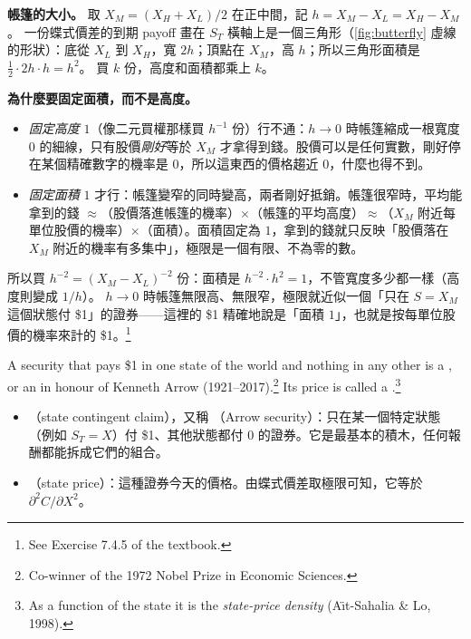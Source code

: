 \textbf{帳篷的大小。}
取 $X_{M}=(X_{H}+X_{L})/2$ 在正中間，記 $h=X_{M}-X_{L}=X_{H}-X_{M}$。
一份蝶式價差的到期 payoff 畫在 $S_{T}$ 橫軸上是一個三角形（\autoref{fig:butterfly} 虛線的形狀）：底從 $X_{L}$ 到 $X_{H}$，寬 $2h$；頂點在 $X_{M}$，高 $h$；所以三角形面積是 $\tfrac12\cdot 2h\cdot h=h^{2}$。
買 $k$ 份，高度和面積都乘上 $k$。

\textbf{為什麼要固定面積，而不是高度。}
\begin{itemize}[itemsep=0.3em]
	\item \emph{固定高度} $1$（像二元買權那樣買 $h^{-1}$ 份）行不通：$h\to 0$ 時帳篷縮成一根寬度 $0$ 的細線，只有股價\emph{剛好}等於 $X_{M}$ 才拿得到錢。股價可以是任何實數，剛好停在某個精確數字的機率是 $0$，所以這東西的價格趨近 $0$，什麼也得不到。
	\item \emph{固定面積} $1$ 才行：帳篷變窄的同時變高，兩者剛好抵銷。帳篷很窄時，平均能拿到的錢 $\approx$（股價落進帳篷的機率）$\times$（帳篷的平均高度）$\approx$（$X_{M}$ 附近每單位股價的機率）$\times$（面積）。面積固定為 $1$，拿到的錢就只反映「股價落在 $X_{M}$ 附近的機率有多集中」，極限是一個有限、不為零的數。
\end{itemize}
所以買 $h^{-2}=(X_{M}-X_{L})^{-2}$ 份：面積是 $h^{-2}\cdot h^{2}=1$，不管寬度多少都一樣（高度則變成 $1/h$）。
$h\to 0$ 時帳篷無限高、無限窄，極限就近似一個「只在 $S=X_{M}$ 這個狀態付 \$1」的證券——這裡的 \$1 精確地說是「面積 $1$」，也就是按每單位股價的機率來計的 \$1。\footnote{See Exercise 7.4.5 of the textbook.}
\suppend

\begin{definition}
	A security that pays \$1 in one state of the world and nothing in any other is a , or an  in honour of Kenneth Arrow (1921--2017).\footnote{Co-winner of the 1972 Nobel Prize in Economic Sciences.}
	Its price is called a .\footnote{As a function of the state it is the \emph{state-price density} (A\"{\i}t-Sahalia \& Lo, 1998).}
\end{definition}

\suppstart
\begin{remark}
	\begin{itemize}[nosep]
		\item {}（state contingent claim），又稱 （Arrow security）：只在某一個特定狀態（例如 $S_{T}=X$）付 \$1、其他狀態都付 $0$ 的證券。它是最基本的積木，任何報酬都能拆成它們的組合。
		\item {}（state price）：這種證券今天的價格。由蝶式價差取極限可知，它等於 $\partial^{2}C/\partial X^{2}$。
	\end{itemize}
\end{remark}

